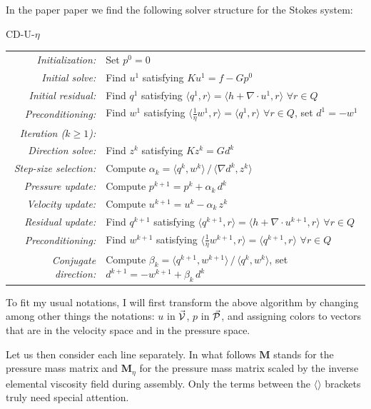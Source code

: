 In the \textcite{jalt26} paper paper we find the following solver structure for the Stokes system:

\begin{algobox}{CD-U-$\eta$}
\begin{tabular}{@{}r@{\quad}l@{}}
\textit{Initialization:} & Set $p^0 = 0$ \\[4pt]
\textit{Initial solve:} & Find $u^1$ satisfying $K u^1 = f - G p^0$ \\[4pt]
\textit{Initial residual:} & Find $q^1$ satisfying $\langle q^1, r \rangle = \langle h + \nabla\!\cdot u^1, r \rangle$ \; $\forall r \in Q$ \\[4pt]
\textit{Preconditioning:} & Find $w^1$ satisfying $\langle \tfrac{1}{\eta} w^1, r \rangle = \langle q^1, r \rangle$ \; $\forall r \in Q$, \; set $d^1 = -w^1$ \\[8pt]
\textit{Iteration ($k \geq 1$):} & \\[4pt]
\textit{Direction solve:} & Find $z^k$ satisfying $K z^k = G d^k$ \\[4pt]
\textit{Step-size selection:} & Compute $\alpha_k = \langle q^k, w^k \rangle \,/\, \langle \nabla d^k, z^k \rangle$ \\[4pt]
\textit{Pressure update:} & Compute $p^{k+1} = p^k + \alpha_k\, d^k$ \\[4pt]
\textit{Velocity update:} & Compute $u^{k+1} = u^k - \alpha_k\, z^k$ \\[4pt]
\textit{Residual update:} & Find $q^{k+1}$ satisfying $\langle q^{k+1}, r \rangle = \langle h + \nabla\!\cdot u^{k+1}, r \rangle$ \; $\forall r \in Q$ \\[4pt]
\textit{Preconditioning:} & Find $w^{k+1}$ satisfying $\langle \tfrac{1}{\eta} w^{k+1}, r \rangle = \langle q^{k+1}, r \rangle$ \; $\forall r \in Q$ \\[4pt]
\textit{Conjugate direction:} & Compute $\beta_k = \langle q^{k+1}, w^{k+1} \rangle \,/\, \langle q^k, w^k \rangle$, \; set $d^{k+1} = -w^{k+1} + \beta_k\, d^k$
\end{tabular} 
\end{algobox}


To fit my usual notations, I will first transform the above algorithm by changing among other things the notations: $u$ in $\vec{\cal V}$, $p$ in $\vec{\cal P}$, and assigning colors 
to vectors that are in the {\color{teal} velocity space} and in the {\color{orange}pressure space}.

Let us then consider each line separately. In what follows ${\bm M}$ stands for the pressure mass matrix and ${\bm M}_\eta$ for the pressure mass matrix scaled by the inverse elemental viscosity field during assembly. Only the terms between the $\langle \rangle$ brackets truly need special attention.

